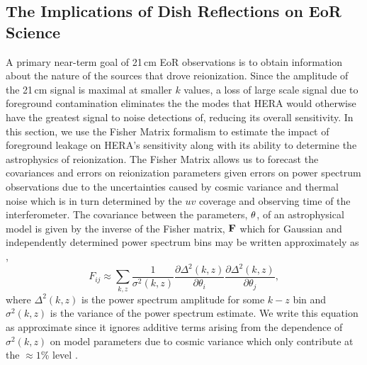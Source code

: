 \documentclass[twocolumn]{emulateapj}
\begin{document}
\subsection{The Implications of Dish Reflections on EoR Science}\label{ssec:Science}
A primary near-term goal of 21\,cm EoR observations is to obtain information about the nature of the sources that drove reionization. Since the amplitude of the 21\,cm signal is maximal at smaller $k$ values, a loss of large scale signal due to foreground contamination eliminates the the modes that HERA would otherwise have the greatest signal to noise detections of, reducing its overall sensitivity. In this section, we use the Fisher Matrix formalism to estimate the impact of foreground leakage on HERA's sensitivity along with its ability to determine the astrophysics of reionization. The Fisher Matrix allows us to forecast the covariances and errors on reionization parameters given errors on power spectrum observations due to the uncertainties caused by cosmic variance and thermal noise which is in turn determined by the $uv$ coverage and observing time of the interferometer. The covariance between the parameters, ${\bf \theta}$, of an astrophysical model is given by the inverse of the Fisher matrix, ${\bf F}$ which for Gaussian and independently determined power spectrum bins may be written approximately as \citep{Pober:2014},
\begin{equation}\label{eq:Fisher}
F_{ij} \approx \sum_{k,z} \frac{1}{\sigma^2(k,z)} \frac{\partial \Delta^2(k,z)}{\partial \theta_i} \frac{\partial \Delta^2(k,z)}{\partial \theta_j},
\end{equation}
where $\Delta^2(k,z)$ is the power spectrum amplitude for some $k-z$ bin and $\sigma^2(k,z)$ is the variance of the power spectrum estimate. We write this equation as approximate since it ignores additive terms arising from the dependence of $\sigma^2(k,z)$ on model parameters due to cosmic variance which only contribute at the $\approx 1$\% level \citep{EwallWice:2015b}. 
\end{document}
